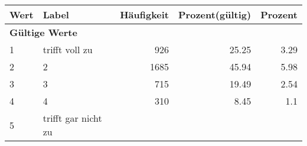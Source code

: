      \begin{longtable}{lXrrr}
     \toprule
     \textbf{Wert} & \textbf{Label} & \textbf{Häufigkeit} & \textbf{Prozent(gültig)} & \textbf{Prozent} \\
     \endhead
     \midrule
     \multicolumn{5}{l}{\textbf{Gültige Werte}}\\

     1 &
     \multicolumn{1}{X}{ trifft voll zu   } &


       \num{926} &
       \num[round-mode=places,round-precision=2]{25,25} &
         \num[round-mode=places,round-precision=2]{3,29} \\

     2 &
     \multicolumn{1}{X}{ 2   } &


       \num{1685} &
       \num[round-mode=places,round-precision=2]{45,94} &
         \num[round-mode=places,round-precision=2]{5,98} \\

     3 &
     \multicolumn{1}{X}{ 3   } &


       \num{715} &
       \num[round-mode=places,round-precision=2]{19,49} &
         \num[round-mode=places,round-precision=2]{2,54} \\

     4 &
     \multicolumn{1}{X}{ 4   } &


       \num{310} &
       \num[round-mode=places,round-precision=2]{8,45} &
         \num[round-mode=places,round-precision=2]{1,1} \\

     5 &
     \multicolumn{1}{X}{ trifft gar nicht zu   } &



\end{longtable}
